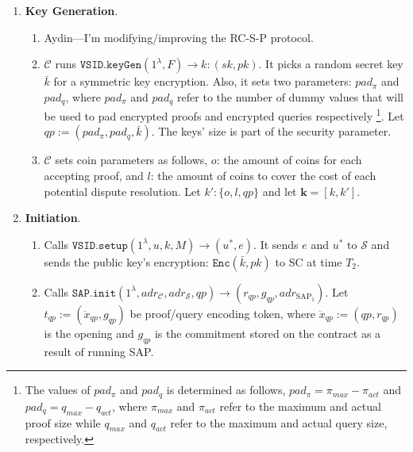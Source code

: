 \begin{enumerate}
\item \textbf{Key Generation}. 
\begin{enumerate}

\item {\color{purple}Aydin---I'm modifying/improving the RC-S-P protocol.}

\item  $\mathcal C$ runs  $\mathtt{VSID.keyGen}(1^{\lambda},F)\rightarrow k:(sk,pk)$. It picks a random secret key  $\bar{k}$ for a symmetric key encryption. Also, it sets two parameters: $pad_{\scriptscriptstyle \pi}$ and $pad_{\scriptscriptstyle q}$, where  $pad_{\scriptscriptstyle \pi}$ and $pad_{\scriptscriptstyle q}$  refer to the number of  dummy values that will be used to pad encrypted proofs and encrypted queries respectively \footnote{\scriptsize The values of  $pad_{\scriptscriptstyle \pi}$ and $pad_{\scriptscriptstyle q}$ is determined as follows, $pad_{\scriptscriptstyle \pi}=\pi_{\scriptscriptstyle max}-\pi_{\scriptscriptstyle act}$ and $pad_{\scriptscriptstyle q}=q_{\scriptscriptstyle max}-q_{\scriptscriptstyle act}$, where $\pi_{\scriptscriptstyle max}$ and $\pi_{\scriptscriptstyle act}$ refer to the maximum and actual proof size  while $q_{\scriptscriptstyle max}$ and $q_{\scriptscriptstyle act}$ refer to the maximum and actual query size, respectively.}.  Let $qp:=(pad_{\scriptscriptstyle \pi},pad_{\scriptscriptstyle q}, \bar{k})$. The keys' size is part of the security parameter. 


\item  $\mathcal C$ sets coin parameters as   follows,   $o$: the amount of coins for each accepting proof, and $l$: the amount of coins  to cover the cost of each potential dispute resolution.    Let $k':\{o,l,qp\}$ and  let $\bm{k}=[k,k']$. 


\end{enumerate}
\item \textbf{Initiation}. 
\begin{enumerate}

\item Calls  $\mathtt{VSID.setup}(1^{\lambda}, u,k,M)\rightarrow (u^{\scriptscriptstyle *},e)$. {\color{purple} It sends  $e$ and $u^{\scriptscriptstyle *}$ to $\mathcal S$ and sends  the public key's encryption: $\mathtt{Enc}(\bar{k},pk)$ to SC at time $T_{\scriptscriptstyle 2}$.}


\item  Calls $\mathtt{SAP.init}(1^{\scriptscriptstyle\lambda}, adr_{\scriptscriptstyle\mathcal{C}}, adr_{\scriptscriptstyle\mathcal{S}},qp )\rightarrow(r_{\scriptscriptstyle qp},g_{\scriptscriptstyle qp},adr_{\scriptscriptstyle\text{SAP}_{\scriptscriptstyle 1}})$.  Let $t_{\scriptscriptstyle qp}:=(\ddot{x}_{\scriptscriptstyle qp}, g_{\scriptscriptstyle qp})$ be proof/query encoding token,  where  $\ddot{x}_{\scriptscriptstyle qp}:=(qp,r_{\scriptscriptstyle qp})$ is the opening and $g_{\scriptscriptstyle qp}$ is the commitment stored on the contract as a result of running   SAP. 



\end{enumerate}
\end{enumerate}
